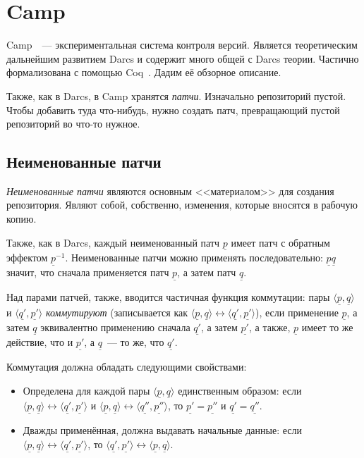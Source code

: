 \section{Camp}

Camp~\cite{camp}~--- экспериментальная система контроля версий.
Является теоретическим дальнейшим развитием Darcs и содержит много
общей с Darcs теории. Частично формализована с помощью Coq~\cite{coq}.
Дадим её обзорное описание.

Также, как в Darcs, в Camp хранятся \emph{патчи}. Изначально
репозиторий пустой. Чтобы добавить туда что-нибудь, нужно создать
патч, превращающий пустой репозиторий во что-то нужное.

\subsection{Неименованные патчи}

\emph{Неименованные патчи} являются основным <<материалом>> для
создания репозитория. Являют собой, собственно, изменения, которые
вносятся в рабочую копию. 

Также, как в Darcs, каждый неименованный патч $\underline{p}$ имеет
патч с обратным эффектом $\underline{p}^{-1}$. Неименованные патчи
можно применять последовательно: $\underline{p}\underline{q}$ значит,
что сначала применяется патч $\underline{p}$, а затем патч
$\underline{q}$.

Над парами патчей, также, вводится частичная функция коммутации: пары
$\langle\underline{p}, \underline{q}\rangle$ и
$\langle\underline{q'}, \underline{p'}\rangle$ \emph{коммутируют}
(записывается как $\langle\underline{p}, \underline{q}\rangle
\longleftrightarrow \langle\underline{q'}, \underline{p'}\rangle$),
если применение $\underline{p}$, а затем $\underline{q}$ эквивалентно
применению сначала $\underline{q'}$, а затем $\underline{p'}$, а
также, $\underline{p}$ имеет то же действие, что и $\underline{p'}$, а
$\underline{q}$~--- то же, что $\underline{q'}$.

Коммутация должна обладать следующими свойствами:

\begin{itemize}
\item Определена для каждой пары $\langle \underline{p}, \underline{q}
  \rangle$ единственным образом: если $\langle \underline{p},
  \underline{q} \rangle \longleftrightarrow \langle \underline{q'},
  \underline{p'}\rangle$ и $\langle \underline{p}, \underline{q}
  \rangle \longleftrightarrow \langle \underline{q''},
  \underline{p''}\rangle$, то $\underline{p'} = \underline{p''}$ и
  $\underline{q'} = \underline{q''}$.
\item Дважды применённая, должна выдавать начальные данные: если
  $\langle \underline{p}, \underline{q} \rangle \longleftrightarrow
  \langle \underline{q'}, \underline{p'}\rangle$, то $\langle
  \underline{q'}, \underline{p'} \rangle \longleftrightarrow \langle
  \underline{p}, \underline{q}\rangle$.
\end{itemize}

